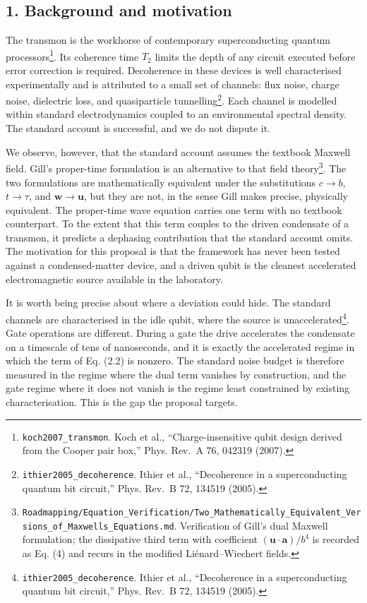 \documentclass[
  11pt,
]{article}
\begin{document}
\hypertarget{background-and-motivation}{%
\subsection{1. Background and
motivation}\label{background-and-motivation}}

The transmon is the workhorse of contemporary superconducting quantum
processors\footnote{\texttt{koch2007\_transmon}. Koch et al.,
  ``Charge-insensitive qubit design derived from the Cooper pair box,''
  Phys. Rev.~A 76, 042319 (2007).}. Its coherence time \(T_2\) limits
the depth of any circuit executed before error correction is required.
Decoherence in these devices is well characterised experimentally and is
attributed to a small set of channels: flux noise, charge noise,
dielectric loss, and quasiparticle tunnelling\footnote{\texttt{ithier2005\_decoherence}.
  Ithier et al., ``Decoherence in a superconducting quantum bit
  circuit,'' Phys. Rev.~B 72, 134519 (2005).}. Each channel is modelled
within standard electrodynamics coupled to an environmental spectral
density. The standard account is successful, and we do not dispute it.

We observe, however, that the standard account assumes the textbook
Maxwell field. Gill's proper-time formulation is an alternative to that
field theory\footnote{\texttt{Roadmapping/Equation\_Verification/Two\_Mathematically\_Equivalent\_Versions\_of\_Maxwells\_Equations.md}.
  Verification of Gill's dual Maxwell formulation; the dissipative third
  term with coefficient \((\mathbf{u}\!\cdot\!\mathbf{a})/b^4\) is
  recorded as Eq. (4) and recurs in the modified Liénard--Wiechert
  fields.}. The two formulations are mathematically equivalent under the
substitutions \(c\to b\), \(t\to\tau\), and \(\mathbf{w}\to\mathbf{u}\),
but they are not, in the sense Gill makes precise, physically
equivalent. The proper-time wave equation carries one term with no
textbook counterpart. To the extent that this term couples to the driven
condensate of a transmon, it predicts a dephasing contribution that the
standard account omits. The motivation for this proposal is that the
framework has never been tested against a condensed-matter device, and a
driven qubit is the cleanest accelerated electromagnetic source
available in the laboratory.

It is worth being precise about where a deviation could hide. The
standard channels are characterised in the idle qubit, where the source
is unaccelerated\footnote{\texttt{ithier2005\_decoherence}. Ithier et
  al., ``Decoherence in a superconducting quantum bit circuit,'' Phys.
  Rev.~B 72, 134519 (2005).}. Gate operations are different. During a
gate the drive accelerates the condensate on a timescale of tens of
nanoseconds, and it is exactly the accelerated regime in which the term
of Eq. (2.2) is nonzero. The standard noise budget is therefore measured
in the regime where the dual term vanishes by construction, and the gate
regime where it does not vanish is the regime least constrained by
existing characterisation. This is the gap the proposal targets.
\end{document}
